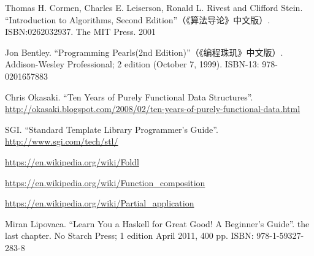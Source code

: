\documentclass[b5paper]{ctexart}
\begin{document}
\ifx\wholebook\relax \else
\begin{thebibliography}{99}

Thomas H. Cormen, Charles E. Leiserson, Ronald L. Rivest and Clifford Stein.
``Introduction to Algorithms, Second Edition''（《算法导论》中文版）. ISBN:0262032937. The MIT Press. 2001

Jon Bentley. ``Programming Pearls(2nd Edition)''（《编程珠玑》中文版）. Addison-Wesley Professional; 2 edition (October 7, 1999). ISBN-13: 978-0201657883

Chris Okasaki. ``Ten Years of Purely Functional Data Structures''. \url{http://okasaki.blogspot.com/2008/02/ten-years-of-purely-functional-data.html}

SGI. ``Standard Template Library Programmer's Guide''. \url{http://www.sgi.com/tech/stl/}

\url{https://en.wikipedia.org/wiki/Foldl}

\url{https://en.wikipedia.org/wiki/Function_composition}

\url{https://en.wikipedia.org/wiki/Partial_application}

Miran Lipovaca. ``Learn You a Haskell for Great Good! A Beginner's Guide''. the last chapter. No Starch Press; 1 edition April 2011, 400 pp. ISBN: 978-1-59327-283-8

\end{thebibliography}

\expandafter\enddocument
\fi
\end{document}
